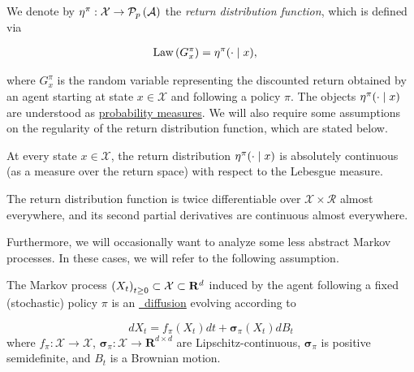We denote by $\returnmeasure^\pi:\mathcal{X}\to\probset{\mathcal{A}}$ the
\emph{return distribution function}, which is defined via

\begin{align*}
  \law{G^\pi_x} &= \returnmeasure^\pi(\cdot\mid x),
\end{align*}

where $G^\pi_x$ is the random variable representing the discounted return
obtained by an agent starting at state $x\in \mathcal{X}$ and following a policy
$\pi$. The objects $\returnmeasure^\pi(\cdot\mid x)$ are understood as
\hyperref[def:probability]{probability measures}. We will also require some
assumptions on the regularity of the return distribution function, which are
stated below.

\begin{assumption}
  \label{ass:method:density}
  At every state $x\in\mathcal{X}$, the return distribution
  $\returnmeasure^\pi(\cdot\mid x)$ is absolutely continuous (as a measure over
  the return space) with respect to the
  Lebesgue measure.
\end{assumption}
\begin{assumption}
  \label{ass:method:c2}
  The return distribution function is twice differentiable over
  $\mathcal{X}\times\mathcal{R}$ almost everywhere, and its second
  partial derivatives are continuous almost everywhere.
\end{assumption}

Furthermore, we will occasionally want to analyze some less abstract Markov
processes. In these cases, we will refer to the following assumption.

\begin{assumption}
  \label{ass:method:ito-diffusion}
  The Markov process $\indexedabove{t}{X}\subset\mathcal{X}\subset\mathbf{R}^d$
  induced by the agent
  following a fixed (stochastic) policy $\pi$ is an
  \hyperref[def:ito-diffusion]{\Ito\ diffusion} evolving
  according to

  \begin{equation}
    \label{eq:method:ito-diffusion}
    dX_t = f_\pi(X_t)dt + \pmb{\sigma}_\pi(X_t)dB_t
  \end{equation}
  where $f_\pi:\mathcal{X}\to\mathcal{X}$,
  $\pmb{\sigma}_\pi:\mathcal{X}\to\mathbf{R}^{d\times d}$ are
  Lipschitz-continuous, 
  $\pmb{\sigma}_\pi$ is positive semidefinite, and $B_t$ is a
  Brownian motion.
\end{assumption}

